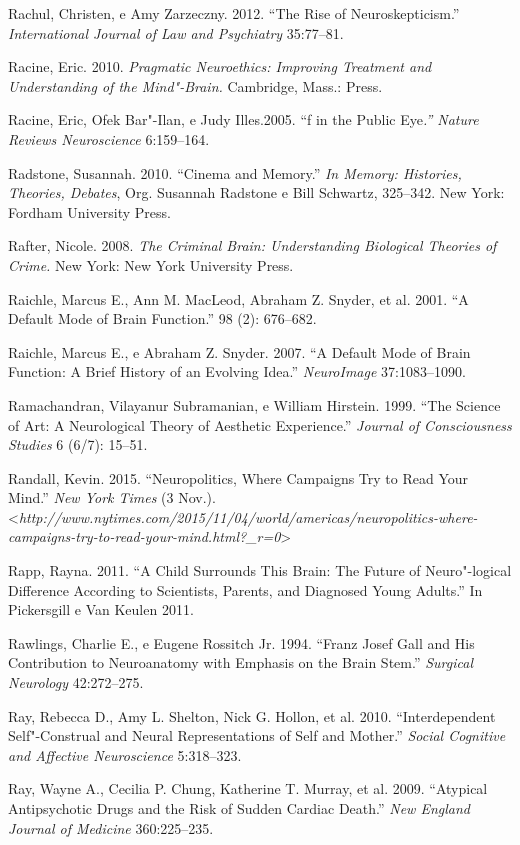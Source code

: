 Rachul, Christen, e Amy Zarzeczny. 2012. ``The Rise of
Neuroskepticism.'' \emph{International Journal of Law and Psychiatry}
35:77--81.

Racine, Eric. 2010. \emph{Pragmatic Neuroethics: Improving Treatment and
Understanding of the Mind"-Brain.} Cambridge, Mass.:  Press.

Racine, Eric, Ofek Bar"-Ilan, e Judy Illes.2005. ``f in the Public
Eye\emph{.'' Nature Reviews Neuroscience} 6:159--164.

Radstone, Susannah. 2010. ``Cinema and Memory.'' \emph{In Memory:
Histories, Theories, Debates}, Org. Susannah Radstone e Bill Schwartz,
325--342. New York: Fordham University Press.

Rafter, Nicole. 2008. \emph{The Criminal Brain: Understanding Biological
Theories of Crime.} New York: New York University Press.

Raichle, Marcus E., Ann M. MacLeod, Abraham Z. Snyder, et al. 2001. ``A
Default Mode of Brain Function.'' \emph{} 98 (2): 676--682.

Raichle, Marcus E., e Abraham Z. Snyder. 2007. ``A Default Mode of Brain
Function: A Brief History of an Evolving Idea.'' \emph{NeuroImage}
37:1083--1090.

Ramachandran, Vilayanur Subramanian, e William Hirstein. 1999. ``The
Science of Art: A Neurological Theory of Aesthetic Experience.''
\emph{Journal of Consciousness Studies} 6 (6/7): 15--51.

Randall, Kevin. 2015. ``Neuropolitics, Where Campaigns Try to Read Your
Mind.'' \emph{New York Times} (3 Nov.).
\textless{}\emph{http://www.nytimes.com/2015/11/04/world/americas/neuropolitics-where-campaigns-try-to-read-your-mind.html?\_r​=0}\textgreater{}

Rapp, Rayna. 2011. ``A Child Surrounds This Brain: The Future of
Neuro"-logical Difference According to Scientists, Parents, and Diagnosed
Young Adults.'' In Pickersgill e Van Keulen 2011.

Rawlings, Charlie E., e Eugene Rossitch Jr. 1994. ``Franz Josef Gall and
His Contribution to Neuroanatomy with Emphasis on the Brain Stem.''
\emph{Surgical Neurology} 42:272--275.

Ray, Rebecca D., Amy L. Shelton, Nick G. Hollon, et al. 2010.
``Interdependent Self"-Construal and Neural Representations of Self and
Mother.'' \emph{Social Cognitive and Affective Neuroscience} 5:318--323.

Ray, Wayne A., Cecilia P. Chung, Katherine T. Murray, et al. 2009.
``Atypical Antipsychotic Drugs and the Risk of Sudden Cardiac Death.''
\emph{New England Journal of Medicine} 360:225--235.

